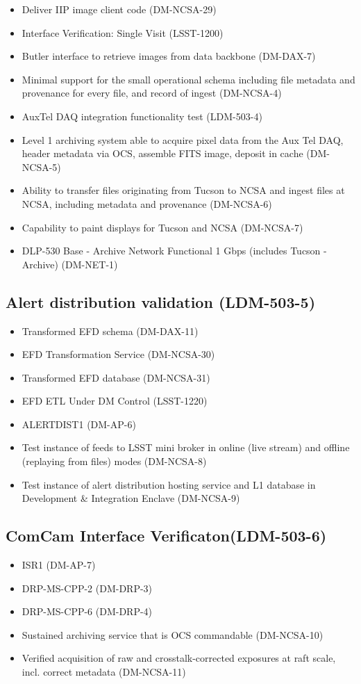 \begin{itemize}
\item Deliver IIP image client code		(DM-NCSA-29)
\item Interface Verification: Single Visit		(LSST-1200)
\item Butler interface to retrieve images from data backbone		(DM-DAX-7)
\item Minimal support for the small operational schema including file metadata and provenance for every file, and record of ingest		(DM-NCSA-4)
\item AuxTel DAQ integration functionality test		(LDM-503-4)
\item Level 1 archiving system able to acquire pixel data from the Aux Tel DAQ, header metadata via OCS, assemble FITS image, deposit in cache		(DM-NCSA-5)
\item Ability to transfer files originating from Tucson to NCSA and ingest files at NCSA, including metadata and provenance		(DM-NCSA-6)
\item Capability to paint displays for Tucson and NCSA		(DM-NCSA-7)
\item DLP-530 Base - Archive Network Functional 1 Gbps (includes Tucson - Archive)		(DM-NET-1)
\end{itemize}
\subsection{Alert distribution validation \textbf{(LDM-503-5)}\label{LDM-503-5}}

\begin{itemize}
\item Transformed EFD schema		(DM-DAX-11)
\item EFD Transformation Service		(DM-NCSA-30)
\item Transformed EFD database		(DM-NCSA-31)
\item EFD ETL Under DM Control		(LSST-1220)
\item ALERTDIST1		(DM-AP-6)
\item Test instance of feeds to LSST mini broker in online (live stream) and offline (replaying from files) modes		(DM-NCSA-8)
\item Test instance of alert distribution hosting service and L1 database in Development \& Integration Enclave		(DM-NCSA-9)
\end{itemize}

\subsection{ComCam Interface Verificaton\textbf{(LDM-503-6)}\label{LDM-503-6}}
\begin{itemize}
\item ISR1		(DM-AP-7)
\item DRP-MS-CPP-2		(DM-DRP-3)
\item DRP-MS-CPP-6		(DM-DRP-4)
\item Sustained archiving service that is OCS commandable		(DM-NCSA-10)
\item Verified acquisition of raw and crosstalk-corrected exposures at raft scale, incl. correct metadata		(DM-NCSA-11)
\end{itemize}

